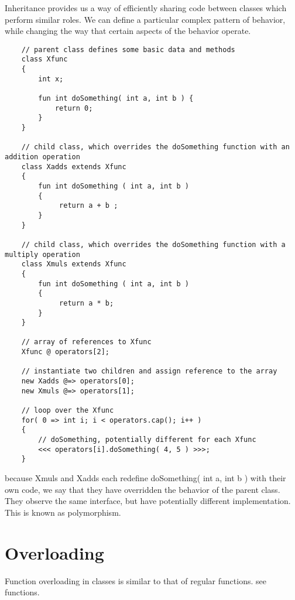 Inheritance provides us a way of efficiently sharing code between classes which perform similar roles. We can define a particular complex pattern of behavior, while changing the way that certain aspects of the behavior operate.
\begin{verbatim}
    // parent class defines some basic data and methods 
    class Xfunc
    { 
        int x; 

        fun int doSomething( int a, int b ) { 
            return 0; 
        }
    }

    // child class, which overrides the doSomething function with an addition operation
    class Xadds extends Xfunc
    { 
        fun int doSomething ( int a, int b )
        { 
             return a + b ; 
        }
    }

    // child class, which overrides the doSomething function with a multiply operation 
    class Xmuls extends Xfunc
    { 
        fun int doSomething ( int a, int b )
        { 
             return a * b; 
        }
    }

    // array of references to Xfunc
    Xfunc @ operators[2];

    // instantiate two children and assign reference to the array 
    new Xadds @=> operators[0];
    new Xmuls @=> operators[1];

    // loop over the Xfunc
    for( 0 => int i; i < operators.cap(); i++ )
    {
        // doSomething, potentially different for each Xfunc
        <<< operators[i].doSomething( 4, 5 ) >>>;
    }
\end{verbatim}
because Xmuls and Xadds each redefine doSomething( int a, int b ) with their own code, we say that they have overridden the behavior of the parent class. They observe the same interface, but have potentially different implementation. This is known as polymorphism.

\section{Overloading}

Function overloading in classes is similar to that of regular functions. see functions.
